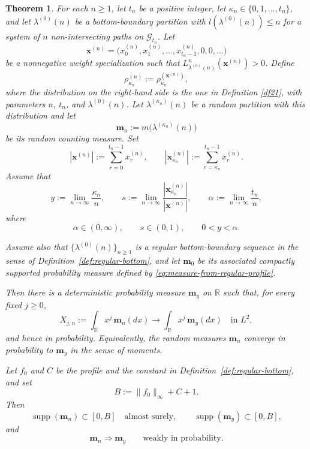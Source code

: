 \documentclass[11pt]{amsart}
\theoremstyle{plain}
\newtheorem{theorem}{Theorem}
\renewcommand\ell{l}
\numberwithin{equation}{section}
\numberwithin{theorem}{section}
\numberwithin{figure}{section}
\begin{document}
\begin{theorem}\label{t15}
For each $n\geq 1$, let $t_n$ be a positive integer, let
$\kappa_n\in\{0,1,\ldots,t_n\}$, and let $\lambda^{(0)}(n)$ be a
bottom-boundary partition with $\ell(\lambda^{(0)}(n))\leq n$ for a system of
$n$ non-intersecting paths on $\mathcal G_{t_n}$. Let
\[
\mathbf{x}^{(n)}
=
\bigl(x_0^{(n)},x_1^{(n)},\ldots,x_{t_n-1}^{(n)},0,0,\ldots\bigr)
\]
be a nonnegative weight specialization such that
$L_{\lambda^{(0)}(n)}^n(\mathbf{x}^{(n)})>0$. Define
\[
\rho_{\kappa_n}^{(n)}
:=
\rho_{\kappa_n}^{(\mathbf{x}^{(n)})},
\]
where the distribution on the right-hand side is the one in Definition
\ref{df21}, with parameters $n$, $t_n$, and $\lambda^{(0)}(n)$. Let
$\lambda^{(\kappa_n)}(n)$ be a random partition with this distribution and let
\[
\mathbf m_n:=m\bigl(\lambda^{(\kappa_n)}(n)\bigr)
\]
be its random counting measure. Set
\[
|\mathbf{x}^{(n)}|
:=\sum_{r=0}^{t_n-1}x_r^{(n)},
\qquad
|\mathbf{x}_{\kappa_n}^{(n)}|
:=\sum_{r=\kappa_n}^{t_n-1}x_r^{(n)}.
\]
Assume that
\begin{equation}
 y:=\lim_{n\to\infty}\frac{\kappa_n}{n},
 \qquad
 s:=\lim_{n\to\infty}
 \frac{|\mathbf{x}_{\kappa_n}^{(n)}|}{|\mathbf{x}^{(n)}|},
 \qquad
 \alpha:=\lim_{n\to\infty}\frac{t_n}{n},
 \label{lms1}
\end{equation}
where
\[
\alpha\in(0,\infty),
\qquad
s\in(0,1),
\qquad
0<y<\alpha.
\]


Assume also that $\{\lambda^{(0)}(n)\}_{n\geq1}$ is a regular
bottom-boundary sequence in the sense of
Definition~\ref{def:regular-bottom}, and let $\mathbf m_0$ be its
associated compactly supported probability measure defined by
\eqref{eq:measure-from-regular-profile}.


Then there is a deterministic probability measure $\mathbf m_y$ on $\mathbb R$
such that, for every fixed $j\geq 0$,
\[
X_{j,n}:=\int_{\mathbb R}x^j\,\mathbf m_n(dx)
\longrightarrow
\int_{\mathbb R}x^j\,\mathbf m_y(dx)
\quad\text{in }L^2,
\]
and hence in probability. Equivalently, the random measures $\mathbf m_n$
converge in probability to $\mathbf m_y$ in the sense of moments.


Let \(f_0\) and \(C\) be the profile and the constant in
Definition~\ref{def:regular-bottom}, and set
\[
    B:=\lVert f_0\rVert_\infty+C+1.
\]
Then
\[
    \operatorname{supp}(\mathbf m_n)\subset[0,B]
    \quad\text{almost surely},
    \qquad
    \operatorname{supp}(\mathbf m_y)\subset[0,B],
\]
and
\[
    \mathbf m_n\Longrightarrow\mathbf m_y
    \qquad\text{weakly in probability}.
\]



\end{theorem}
\end{document}
